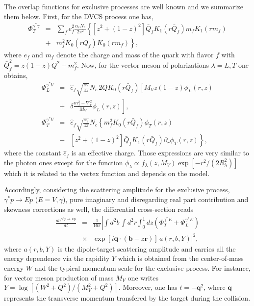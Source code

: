 \documentclass[twocolumn,showpacs,preprintnumbers,amsmath,amssymb,showkeys,aps,prd,a4paper,byrevtex]{revtex4}
\begin{document}
The overlap functions for exclusive processes are well known \cite{mwfs1,mwfs2,mwfs3} and we summarize them below. First, for the DVCS process one has,
\begin{eqnarray}
\label{ovdvcs}
\Phi^{\gamma^*\gamma}_T
   & = &\sum_f e_f^2 \frac{\alpha_e N_c}{2\pi^2}\left\{
           [z^2+(1-z)^2]\bar Q_f K_1(r\bar Q_f) m_f K_1(rm_f) \right. \nonumber \\
          & + & \left. m_f^2 K_0(r\bar Q_f) K_0(rm_f) \right\}, 
\end{eqnarray}
where $e_f$ and $m_f$ denote the charge and mass of the quark with flavor $f$ with $\bar Q_f^2 = z(1-z)Q^2+m_f^2$. Now, for the vector meson of polarizations $\lambda = L,T$  one obtains,
\begin{eqnarray}
\label{ovvml}
\Phi^{\gamma^*V}_L 
   & = & \hat{e}_f \sqrt{\frac{\alpha_e}{4\pi}} N_c \, 2QK_0(r\bar Q_f)  
\left[M_Vz(1-z)\phi_L(r,z) \right. \nonumber  \\
& +& \left. \delta\frac{m_f^2-\nabla_r^2}{M_V}\phi_L(r,z)\right],\\
\Phi^{\gamma^*V}_T 
   & = & \hat{e}_f \sqrt{\frac{\alpha_e}{4\pi}} N_c\left\{
             m_f^2 K_0(r\bar Q_f)\phi_T(r,z)  \right. \nonumber \\
           & - & \left.  [z^2+(1-z)^2]\bar Q_f K_1(r\bar Q_f) \partial_r\phi_T(r,z)  \right\},
\label{ovvmt}
\end{eqnarray}
where the constant $\hat{e}_f$ is an effective charge.  Those expressions are very similar to the photon ones except for the function $\phi_{\lambda}\propto f_{\lambda}(z,M_V)\exp\left[-r^2/(2R_{\lambda}^2)\right]$ which it is related to the
vertex function and depends on the model.

Accordingly, considering the scattering amplitude for the exclusive process, $\gamma^*p\rightarrow Ep$ ($E=V,\gamma$), pure imaginary and disregarding real part contribution and skewness corrections as well, the differential cross-section reads 
\begin{eqnarray}
\frac{d\sigma^{\gamma^*p\rightarrow Ep}}{dt} & = & 
  \frac{1}{16\pi} \left|\int d^2b\, \int
  d^2r \int_0^1 dz \left(\Phi_{T}^{\gamma^*E}+\Phi_{L}^{\gamma^*E}\right) \right. \nonumber \\
 &\times & \left.  \exp\left[i\mathbf{q}\cdot\left(\mathbf{b}-z\mathbf{r}\right)\right]\,a (r,b,Y)\right|^2,\label{eq:sigmaeldip} 
\end{eqnarray}
where $a(r,b,Y)$ is the dipole-target scattering amplitude
and carries all the energy dependence via the rapidity $Y$ which is
obtained from the center-of-mass energy $W$ and the  typical momentum scale for the exclusive process. For instance, for vector meson production of mass $M_V$ one writes $Y = \log[(W^2+Q^2)/(M_V^2+Q^2)]$. Moreover,  one has $t=-\mathbf{q}^2$, where  $\mathbf{q}$ represents the transverse momentum transfered by the target during the collision.
\end{document}
